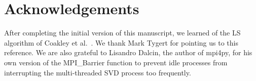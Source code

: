 \documentclass{siamltex}
\begin{document}
\section*{Acknowledgements}

After completing the initial version of this manuscript, we learned of
the LS algorithm of Coakley et al.\ \cite{coakley2011fast}.
We thank Mark Tygert for pointing us to this reference.  We are also
grateful to Lisandro Dalcin, the author of mpi4py, for his own version
of the MPI\_Barrier function to prevent idle processes from
interrupting the multi-threaded SVD process too frequently.

\newpage



\end{document}
